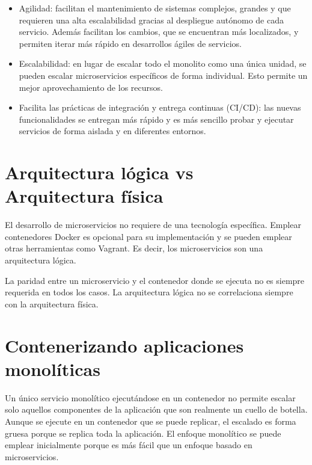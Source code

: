 \documentclass[11pt,a4paper]{article}
\begin{document}
\begin{itemize}

\item Agilidad: facilitan el mantenimiento de sistemas complejos, grandes y que requieren una alta escalabilidad gracias al despliegue autónomo de cada servicio. Además facilitan los cambios, que se encuentran más localizados, y permiten iterar más rápido en desarrollos ágiles de servicios.

\item Escalabilidad: en lugar de escalar todo el monolito como una única unidad, se pueden escalar microservicios específicos de forma individual. Esto permite un mejor aprovechamiento de los recursos.

\item Facilita las prácticas de integración y entrega continuas (CI/CD): las nuevas funcionalidades se entregan más rápido y es más sencillo probar y ejecutar servicios de forma aislada y en diferentes entornos.

\end{itemize}

\section{Arquitectura lógica vs Arquitectura física}

El desarrollo de microservicios no requiere de una tecnología específica. Emplear contenedores Docker es opcional para su implementación y se pueden emplear otras herramientas como Vagrant. Es decir, los microservicios son una arquitectura lógica.

La paridad entre un microservicio y el contenedor donde se ejecuta no es siempre requerida en todos los casos. La arquitectura lógica no se correlaciona siempre con la arquitectura física. 

\section{Contenerizando aplicaciones monolíticas}

Un único servicio monolítico ejecutándose en un contenedor no permite escalar solo aquellos componentes de la aplicación que son realmente un cuello de botella. Aunque se ejecute en un contenedor que se puede replicar, el escalado es forma gruesa porque se replica toda la aplicación. El enfoque monolítico se puede emplear inicialmente porque es más fácil que un enfoque basado en microservicios.
\end{document}
